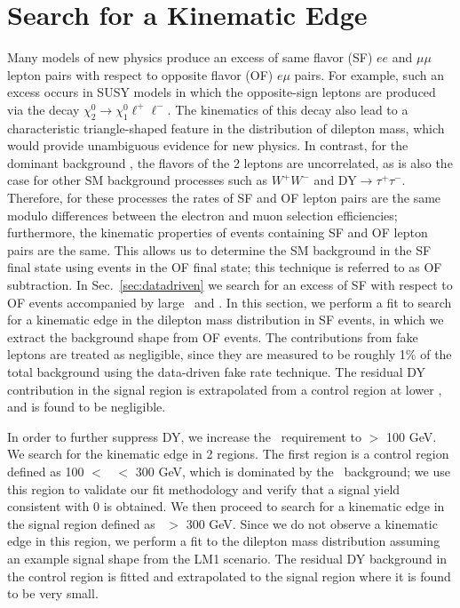 \section{Search for a Kinematic Edge}
\label{sec:fit}

Many models of new physics produce an excess of same flavor (SF) $ee$ and $\mu\mu$ lepton pairs
with respect to opposite flavor (OF) $e\mu$ pairs. For example, such an excess occurs in SUSY models
in which the opposite-sign leptons are produced via the decay $\chi_2^0 \to \chi_1^0 \ell^+\ell^-$.
The kinematics of this decay also lead to a characteristic triangle-shaped feature in the distribution
of dilepton mass, which would provide unambiguous evidence for new physics.
In contrast, for the dominant background \ttbar, the flavors of the 2 leptons are uncorrelated,
as is also the case for other SM background processes such as $W^+W^-$ and DY$\to\tau^+\tau^-$.
Therefore, for these processes the rates of SF and OF lepton pairs are the same modulo differences
between the electron and muon selection efficiencies; 
furthermore, the kinematic properties of events containing SF and OF lepton pairs are the same. 
This allows us to determine the SM background in the SF final state using events in the OF
final state; this technique is referred to as OF subtraction. In Sec.~\ref{sec:datadriven}
we search for an excess of SF with respect to OF events accompanied by large \MET\ and \Ht. 
In this section, we perform a fit to search for a kinematic edge in the dilepton mass distribution 
in SF events, in which we extract the background shape from OF events.
The contributions from fake leptons are treated as negligible, since they are measured
to be roughly 1\% of the total background using the data-driven fake rate technique.
The residual DY contribution in the signal region is extrapolated from a control region at lower \Ht,
and is found to be negligible.

In order to further suppress DY, we increase the \MET\ requirement to \MET $>$ 100 GeV. 
We search for the kinematic edge in 2 regions.  The first region is a control region defined
as 100 $<$ \Ht\ $<$ 300 GeV, which is dominated by the \ttbar\ background; we use 
this region to validate our fit methodology and verify that a signal yield consistent with 0 
is obtained. We then proceed to search for a kinematic edge in the signal region defined as 
\Ht\ $>$ 300 GeV. Since we do not observe a kinematic edge in this region, we perform a 
fit to the dilepton mass distribution assuming an example signal shape from the LM1 scenario.
The residual DY background in the control region is fitted and extrapolated
to the signal region where it is found to be very small.

